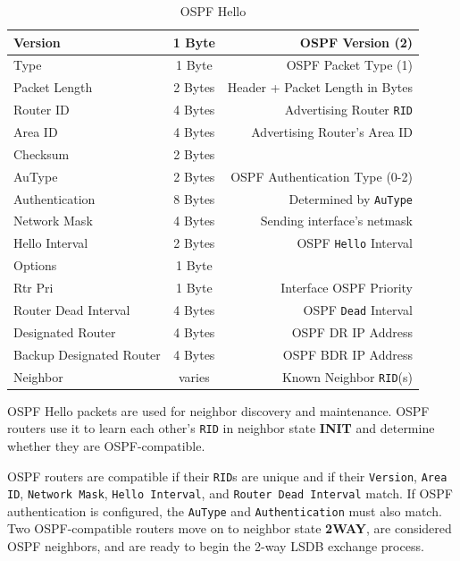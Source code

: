 \documentclass[12pt]{article}
\begin{document}
	\begin{table}[H]
	\centering
	\caption{OSPF Hello \label{tab:OSPF HELLO}}
	\begin{tabular}{| l | c | r |}
	\hline
	Version				& 1 Byte	& OSPF Version (2)\\\hline
	Type					& 1 Byte	& OSPF Packet Type (1)\\\hline
	Packet Length			& 2 Bytes	& Header + Packet Length in Bytes\\\hline
	Router ID				& 4 Bytes	& Advertising Router \texttt{RID}\\\hline
	Area ID				& 4 Bytes	& Advertising Router's Area ID\\\hline
	Checksum				& 2 Bytes	&\\\hline
	AuType				& 2 Bytes	& OSPF Authentication Type (0-2)\\\hline
	Authentication			& 8 Bytes	& Determined by \texttt{AuType}\\\hline
	Network Mask			& 4 Bytes	& Sending interface's netmask\\\hline
	Hello Interval			& 2 Bytes	& OSPF \texttt{Hello} Interval\\\hline
	Options				& 1 Byte	&\\\hline
	Rtr Pri				& 1 Byte	& Interface OSPF Priority\\\hline
	Router Dead Interval		& 4 Bytes	& OSPF \texttt{Dead} Interval\\\hline
	Designated Router		& 4 Bytes	& OSPF DR IP Address\\\hline
	Backup Designated Router	& 4 Bytes	& OSPF BDR IP Address\\\hline
	Neighbor				& varies	& Known Neighbor \texttt{RID}(s)\\\hline
	\end{tabular}\end{table}
	OSPF Hello packets are used for neighbor discovery and maintenance. OSPF routers use it to learn each other's \texttt{RID} in neighbor state \textbf{INIT} and determine whether they are OSPF-compatible.
	
	OSPF routers are compatible if their \texttt{RID}s are unique and if their \texttt{Version}, \texttt{Area ID}, \texttt{Network Mask}, \texttt{Hello Interval}, and \texttt{Router Dead Interval} match. If OSPF authentication is configured, the \texttt{AuType} and \texttt{Authentication} must also match. Two OSPF-compatible routers move on to neighbor state \textbf{2WAY}, are considered OSPF neighbors, and are ready to begin the 2-way LSDB exchange process.
	
\end{document}
